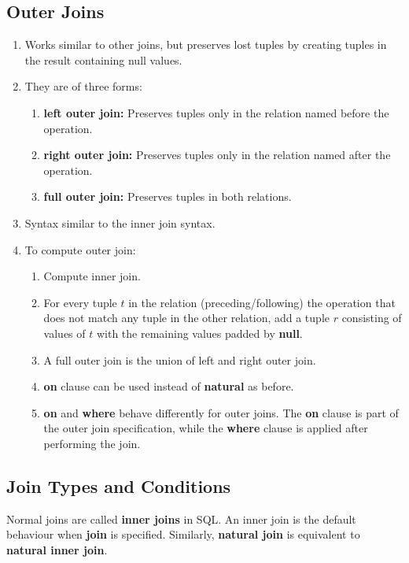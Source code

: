 \documentclass[journal,12pt,twocolumn]{IEEEtran}
\begin{document}
\subsection{Outer Joins}
\begin{enumerate}
    \item Works similar to other joins, but preserves lost tuples by creating 
    tuples in the result containing null values.
    \item They are of three forms:
    \begin{enumerate}
        \item \textbf{left outer join:} Preserves tuples only in the relation 
        named before the operation.
        \item \textbf{right outer join:} Preserves tuples only in the relation 
        named after the operation.
        \item \textbf{full outer join:} Preserves tuples in both relations.
    \end{enumerate}
    \item Syntax similar to the inner join syntax.
    \item To compute outer join:
    \begin{enumerate}
        \item Compute inner join.
        \item For every tuple $t$ in the relation (preceding/following) the 
        operation that does not match any tuple in the other relation, add a 
        tuple $r$ consisting of values of $t$ with the remaining values padded 
        by \textbf{null}.
        \item A full outer join is the union of left and right outer join.
        \item \textbf{on} clause can be used instead of \textbf{natural} as 
        before.
        \item \textbf{on} and \textbf{where} behave differently for outer 
        joins. The \textbf{on} clause is part of the outer join specification,
        while the \textbf{where} clause is applied after performing the join.
    \end{enumerate}
\end{enumerate}

\subsection{Join Types and Conditions}

Normal joins are called \textbf{inner joins} in SQL. An inner join is the 
default behaviour when \textbf{join} is specified. Similarly, 
\textbf{natural join} is equivalent to \textbf{natural inner join}.
\end{document}
